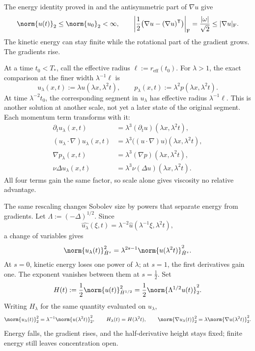 The energy identity proved in  and the antisymmetric part of \(\nabla u\) give
\[
  \norm{u(t)}_2
  \leq
  \norm{u_0}_2
  <\infty,
  \qquad
  \left|\frac12\bigl(\nabla u-(\nabla u)^{\mathsf T}\bigr)\right|_{\mathrm F}
  =
  \frac{|\omega|}{\sqrt2}
  \leq
  |\nabla u|_{\mathrm F}.
\]
The kinetic energy can stay finite while the rotational part of the gradient grows. The gradients rise.


At a time \(t_0<T_*\), call the effective radius \(\ell:=r_{\mathrm{eff}}(t_0)\).
For \(\lambda>1\), the exact \NavierStokes{} comparison at the finer width \(\lambda^{-1}\ell\) is
\[
  u_\lambda(x,t)
  :=
  \lambda u(\lambda x,\lambda^2t),
  \qquad
  p_\lambda(x,t)
  :=
  \lambda^2p(\lambda x,\lambda^2t).
\]
At time \(\lambda^{-2}t_0\), the corresponding segment in \(u_\lambda\) has effective radius \(\lambda^{-1}\ell\).
This is another solution at another scale, not yet a later state of the original segment.
Each momentum term transforms with it:
\[
\begin{aligned}
  \partial_tu_\lambda(x,t)
  &=
  \lambda^3(\partial_tu)(\lambda x,\lambda^2t),
  \\
  (u_\lambda\cdot\nabla)u_\lambda(x,t)
  &=
  \lambda^3\bigl((u\cdot\nabla)u\bigr)(\lambda x,\lambda^2t),
  \\
  \nabla p_\lambda(x,t)
  &=
  \lambda^3(\nabla p)(\lambda x,\lambda^2t),
  \\
  \nu\Delta u_\lambda(x,t)
  &=
  \lambda^3\nu(\Delta u)(\lambda x,\lambda^2t).
\end{aligned}
\]
All four terms gain the same factor, so scale alone gives viscosity no relative advantage.


The same rescaling changes Sobolev size by powers that separate energy from gradients.
Let \(\Lambda:=(-\Delta)^{1/2}\).
Since
\[
  \widehat{u_\lambda}(\xi,t)
  =
  \lambda^{-2}\widehat u(\lambda^{-1}\xi,\lambda^2t),
\]
a change of variables gives
\[
  \norm{u_\lambda(t)}_{\dot H^s}^2
  =
  \lambda^{2s-1}
  \norm{u(\lambda^2t)}_{\dot H^s}^2.
\]
At \(s=0\), kinetic energy loses one power of \(\lambda\); at \(s=1\), the first derivatives gain one.
The exponent vanishes between them at \(s=\tfrac12\).
Set
\[
  H(t)
  :=
  \frac12\norm{u(t)}_{\dot H^{1/2}}^2
  =
  \frac12\norm{\Lambda^{1/2}u(t)}_2^2.
\]
Writing \(H_\lambda\) for the same quantity evaluated on \(u_\lambda\),
\[
  \norm{u_\lambda(t)}_2^2
  =
  \lambda^{-1}\norm{u(\lambda^2t)}_2^2,
  \qquad
  H_\lambda(t)=H(\lambda^2t),
  \qquad
  \norm{\nabla u_\lambda(t)}_2^2
  =
  \lambda\norm{\nabla u(\lambda^2t)}_2^2.
\]
Energy falls, the gradient rises, and the half-derivative height stays fixed; finite energy still leaves concentration open.

